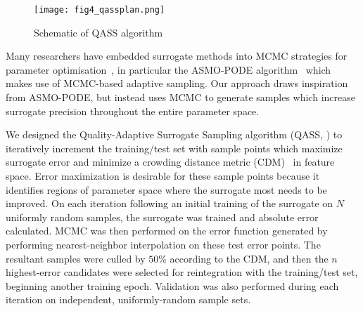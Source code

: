 \begin{figure}
	\centering
	\hspace*{-5pt}\texttt{[image: fig4\_qassplan.png]}
	\caption{\label{fig:qassplan}Schematic of QASS algorithm}
\end{figure}

Many researchers have embedded surrogate methods into MCMC strategies for
parameter optimisation~\cite{Zhang2020,Gong2017}, in particular the ASMO-PODE
algorithm~\cite{Ginting2011} which makes use of MCMC-based adaptive sampling. Our approach draws inspiration from ASMO-PODE, but instead uses MCMC to generate samples
which increase surrogate precision throughout the entire parameter space.

We designed the Quality-Adaptive Surrogate Sampling algorithm (QASS, ) to iteratively increment the training/test set with sample
points which maximize surrogate error and minimize a crowding distance metric
(CDM)~\cite{Solonen2012} in feature space. Error maximization is desirable for these sample points because it identifies regions of parameter space where the surrogate most needs to be improved. On each iteration following an initial training of the surrogate on $N$ uniformly random samples, the surrogate was trained and absolute error calculated. MCMC was then performed on the error function generated by performing nearest-neighbor interpolation on these test error points. The resultant samples were culled by $50\%$ according to the CDM, and then the $n$ highest-error candidates were selected for reintegration with the training/test set, beginning another training epoch. Validation was also performed during each iteration on independent, uniformly-random sample sets.
